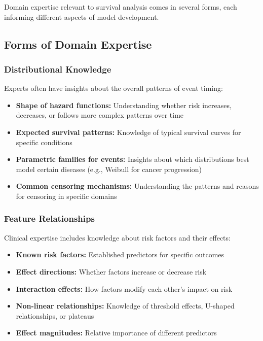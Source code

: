 Domain expertise relevant to survival analysis comes in several forms, each informing different aspects of model development.

\subsection{Forms of Domain Expertise}

\subsubsection{Distributional Knowledge}

Experts often have insights about the overall patterns of event timing:

\begin{itemize}
    \item \textbf{Shape of hazard functions:} Understanding whether risk increases, decreases, or follows more complex patterns over time
    \item \textbf{Expected survival patterns:} Knowledge of typical survival curves for specific conditions
    \item \textbf{Parametric families for events:} Insights about which distributions best model certain diseases (e.g., Weibull for cancer progression)
    \item \textbf{Common censoring mechanisms:} Understanding the patterns and reasons for censoring in specific domains
\end{itemize}

\subsubsection{Feature Relationships}

Clinical expertise includes knowledge about risk factors and their effects:

\begin{itemize}
    \item \textbf{Known risk factors:} Established predictors for specific outcomes
    \item \textbf{Effect directions:} Whether factors increase or decrease risk
    \item \textbf{Interaction effects:} How factors modify each other's impact on risk
    \item \textbf{Non-linear relationships:} Knowledge of threshold effects, U-shaped relationships, or plateaus
    \item \textbf{Effect magnitudes:} Relative importance of different predictors
\end{itemize}

